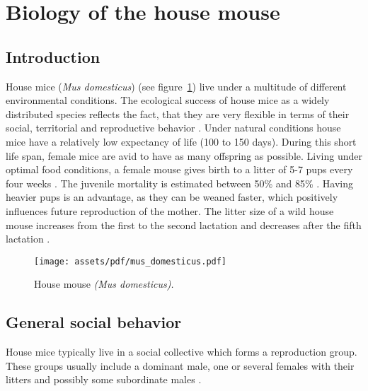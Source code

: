 \newpage
\section{Biology of the house mouse}
\label{sec:biolhousemice}

\subsection{Introduction}
\label{subsec:introduction}

House mice (\textit{Mus domesticus}) (see figure~\ref{fig:housemice}) live under a multitude of different environmental conditions. The ecological success of house mice as a widely distributed species reflects the fact, that they are very flexible in terms of their social, territorial and reproductive behavior \citep{bronson:79, bronson:84, berry:81}. Under natural conditions house mice have a relatively low expectancy of life (100 to 150 days). During this short life span, female mice are avid to have as many offspring as possible. Living under optimal food conditions, a female mouse gives birth to a litter of 5-7 pups every four weeks \citep{berry:71, pelikan:81}. The juvenile mortality is estimated between 50\% and 85\% \citep{berry:71, berry:75, pennycuik:86}. Having heavier pups is an advantage, as they can be weaned faster, which positively influences future reproduction of the mother\citep{fuchs:82}. The litter size of a wild house mouse increases from the first to the second lactation and decreases after the fifth lactation \citep{pelikan:81, koenig:87b}. 

\begin{figure}[htbp]	
\centering	
\texttt{[image: assets/pdf/mus\_domesticus.pdf]}	
\caption[House mouse]{House mouse \textit{(Mus domesticus).}}
\label{fig:housemice}
\end{figure}

\subsection{General social behavior}
\label{subsec:socialbehaviour}
House mice typically live in a social collective which forms a reproduction group. These groups usually include a dominant male, one or several females with their litters and possibly some subordinate males \citep{crowcroft:63, reimer:67, selander:70, mackintosh:81}.

